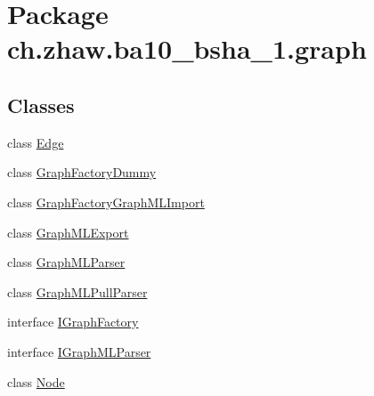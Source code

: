 \hypertarget{namespacech_1_1zhaw_1_1ba10__bsha__1_1_1graph}{
\section{Package ch.zhaw.ba10\_\-bsha\_\-1.graph}
\label{namespacech_1_1zhaw_1_1ba10__bsha__1_1_1graph}
}
\subsection*{Classes}
\begin{DoxyCompactItemize}
\item 
class \hyperlink{classch_1_1zhaw_1_1ba10__bsha__1_1_1graph_1_1Edge}{Edge}
\item 
class \hyperlink{classch_1_1zhaw_1_1ba10__bsha__1_1_1graph_1_1GraphFactoryDummy}{GraphFactoryDummy}
\item 
class \hyperlink{classch_1_1zhaw_1_1ba10__bsha__1_1_1graph_1_1GraphFactoryGraphMLImport}{GraphFactoryGraphMLImport}
\item 
class \hyperlink{classch_1_1zhaw_1_1ba10__bsha__1_1_1graph_1_1GraphMLExport}{GraphMLExport}
\item 
class \hyperlink{classch_1_1zhaw_1_1ba10__bsha__1_1_1graph_1_1GraphMLParser}{GraphMLParser}
\item 
class \hyperlink{classch_1_1zhaw_1_1ba10__bsha__1_1_1graph_1_1GraphMLPullParser}{GraphMLPullParser}
\item 
interface \hyperlink{interfacech_1_1zhaw_1_1ba10__bsha__1_1_1graph_1_1IGraphFactory}{IGraphFactory}
\item 
interface \hyperlink{interfacech_1_1zhaw_1_1ba10__bsha__1_1_1graph_1_1IGraphMLParser}{IGraphMLParser}
\item 
class \hyperlink{classch_1_1zhaw_1_1ba10__bsha__1_1_1graph_1_1Node}{Node}
\end{DoxyCompactItemize}
